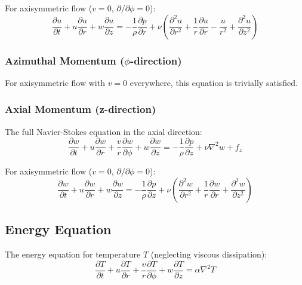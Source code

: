 For axisymmetric flow ($v = 0$, $\partial/\partial\phi = 0$):
\begin{equation}
    \boxed{\frac{\partial u}{\partial t} + u\frac{\partial u}{\partial r} + w\frac{\partial u}{\partial z} = -\frac{1}{\rho}\frac{\partial p}{\partial r} + \nu\left(\frac{\partial^2 u}{\partial r^2} + \frac{1}{r}\frac{\partial u}{\partial r} - \frac{u}{r^2} + \frac{\partial^2 u}{\partial z^2}\right)}
\end{equation}

\subsubsection{Azimuthal Momentum ($\phi$-direction)}

For axisymmetric flow with $v = 0$ everywhere, this equation is trivially satisfied.

\subsubsection{Axial Momentum (z-direction)}

The full Navier-Stokes equation in the axial direction:
\begin{equation}
    \frac{\partial w}{\partial t} + u\frac{\partial w}{\partial r} + \frac{v}{r}\frac{\partial w}{\partial \phi} + w\frac{\partial w}{\partial z} = -\frac{1}{\rho}\frac{\partial p}{\partial z} + \nu\nabla^2 w + f_z
\end{equation}

For axisymmetric flow ($v = 0$, $\partial/\partial\phi = 0$):
\begin{equation}
    \boxed{\frac{\partial w}{\partial t} + u\frac{\partial w}{\partial r} + w\frac{\partial w}{\partial z} = -\frac{1}{\rho}\frac{\partial p}{\partial z} + \nu\left(\frac{\partial^2 w}{\partial r^2} + \frac{1}{r}\frac{\partial w}{\partial r} + \frac{\partial^2 w}{\partial z^2}\right)}
\end{equation}

\subsection{Energy Equation}

The energy equation for temperature $T$ (neglecting viscous dissipation):
\begin{equation}
    \frac{\partial T}{\partial t} + u\frac{\partial T}{\partial r} + \frac{v}{r}\frac{\partial T}{\partial \phi} + w\frac{\partial T}{\partial z} = \alpha\nabla^2 T
\end{equation}

